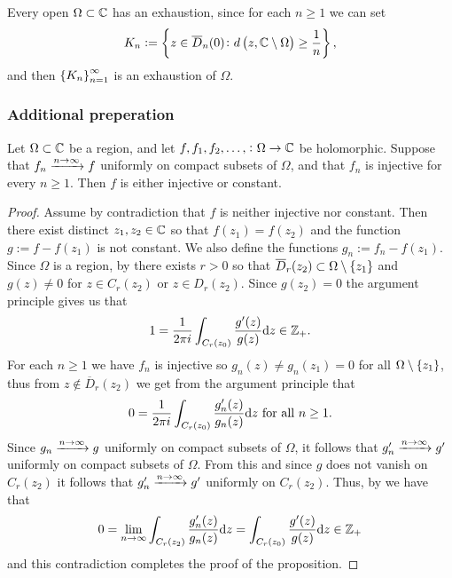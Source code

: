\documentclass[11pt,a4paper]{article}
\begin{document}
\begin{remark}
  Every open $\Omega \subset \mathbb{C}$ has an exhaustion,
  since for each $n \geq 1$ we can set
  \[
    K_n :=
    \set{z \in \overline D_n(0) \colon
    d\del{z, \C \setminus \Omega} \geq \frac{1}{n}},
  \]
  and then $\left\{K_n\right\}_{n=1}^{\infty}$ is an exhaustion of $\Omega$.
\end{remark}

\subsubsection{Additional preperation}

\begin{proposition}
  Let $\Omega \subset \mathbb{C}$ be a region,
  and let $f,f_1,f_2,\dots, \colon \Omega \to \mathbb{C}$ be holomorphic.
  Suppose that $f_n \xrightarrow{n \to \infty} f$ uniformly on compact subsets of
  $\Omega$, and that $f_n$ is injective for every $n \geq 1$.
  Then $f$ is either injective or constant.
\end{proposition}
\begin{proof}
  Assume by contradiction that $f$ is neither injective nor constant.
  Then there exist distinct $z_1,z_2 \in \mathbb{C}$ so that $f(z_1) = f(z_2)$ and
  the function $g := f - f(z_1)$ is not constant.
  We also define the functions $g_n := f_n - f(z_1)$.
  Since $\Omega$ is a region, by 
  there exists $r > 0$ so that
  $\overline D_r(z_2) \subset \Omega \setminus \left\{z_1\right\}$ and $g(z) \neq 0$
  for $z \in C_r(z_2)$ or $z \in D_r(z_2)$.
  Since $g(z_2) = 0$ the argument principle gives us that
  \[
    1 = \frac{1}{2 \pi i} \int_{C_r(z_0)} \frac{g'(z)}{g(z)} \mathrm{d} z \in \mathbb{Z}_+.
  \]
  For each $n \geq 1$ we have $f_n$ is injective so $g_n(z) \neq g_n(z_1) = 0$
  for all $\Omega \setminus \left\{z_1\right\}$, thus from $z \notin \overline D_r(z_2)$
  we get from the argument principle that
  \[
    0 = \frac{1}{2 \pi i} \int_{C_r(z_0)} \frac{g_n'(z)}{g_n(z)} \mathrm{d} z
    \text{ for all } n \geq 1.
  \]
  Since $g_n \xrightarrow{n \to \infty} g$ uniformly on compact subsets of $\Omega$,
  it follows %
  that $g'_n \xrightarrow{n \to \infty} g'$ uniformly on compact subsets of $\Omega$.
  From this and since $g$ does not vanish on $C_r(z_2)$ it follows that
  $g'_n \xrightarrow{n \to \infty} g'$ uniformly on $C_r(z_2)$.
  Thus, by  we have that
  \[
    0 = \lim_{n \to \infty} \int_{C_r(z_2)} \frac{g_n'(z)}{g_n(z)} \mathrm{d} z =
    \int_{C_r(z_0)} \frac{g'(z)}{g(z)} \mathrm{d} z \in \mathbb{Z}_{+}
  \]
  and this contradiction completes the proof of the proposition.
\end{proof}
\end{document}
